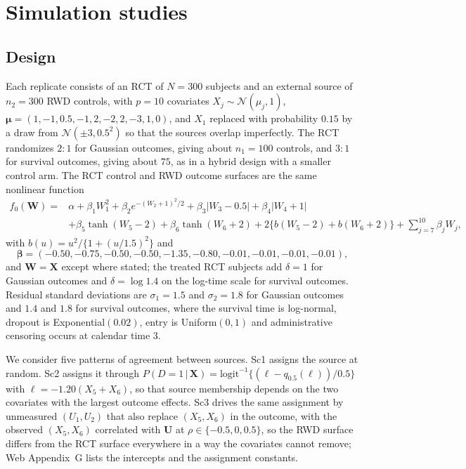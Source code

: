 \documentclass[11pt]{article}
\newcommand{\Normal}{\mathcal{N}}
\newcommand{\logit}{\mathrm{logit}}
\newcommand{\given}{\,\vert\,}
\theoremstyle{definition}
\theoremstyle{plain}
\begin{document}
\section{Simulation studies}
\label{sec:sim}

\subsection{Design}
\label{sec:sim_design}

Each replicate consists of an RCT of $N=300$ subjects and an external source of $n_2=300$ RWD controls, with $p=10$ covariates $X_j\sim\Normal(\mu_j,1)$, $\bm\mu=(1,-1,0.5,-1,2,-2,2,-3,1,0)$, and $X_1$ replaced with probability $0.15$ by a draw from $\Normal(\pm3,0.5^2)$ so that the sources overlap imperfectly. The RCT randomizes $2{:}1$ for Gaussian outcomes, giving about $n_1=100$ controls, and $3{:}1$ for survival outcomes, giving about $75$, as in a hybrid design with a smaller control arm. The RCT control and RWD outcome surfaces are the same nonlinear function
\begin{equation}
\begin{aligned}
f_0(\bm W)={}&\alpha+\beta_1W_1^2+\beta_2e^{-(W_2+1)^2/2}+\beta_3|W_3-0.5|+\beta_4|W_4+1|\\
&+\beta_5\tanh(W_5-2)+\beta_6\tanh(W_6+2)+2\{b(W_5-2)+b(W_6+2)\}+\textstyle\sum_{j=7}^{10}\beta_jW_j,
\end{aligned}
\label{eq:dgp}
\end{equation}
with $b(u)=u^2/\{1+(u/1.5)^2\}$ and
\[
\bm\beta=(-0.50,-0.75,-0.50,-0.50,-1.35,-0.80,-0.01,-0.01,-0.01,-0.01),
\]
and $\bm W=\bm X$ except where stated; the treated RCT subjects add $\delta=1$ for Gaussian outcomes and $\delta=\log1.4$ on the log-time scale for survival outcomes. Residual standard deviations are $\sigma_1=1.5$ and $\sigma_2=1.8$ for Gaussian outcomes and $1.4$ and $1.8$ for survival outcomes, where the survival time is log-normal, dropout is Exponential$(0.02)$, entry is Uniform$(0,1)$ and administrative censoring occurs at calendar time $3$.

We consider five patterns of agreement between sources. Sc1 assigns the source at random. Sc2 assigns it through $P(D=1\given\bm X)=\logit^{-1}\{(\ell-q_{0.5}(\ell))/0.5\}$ with $\ell=-1.20(X_5+X_6)$, so that source membership depends on the two covariates with the largest outcome effects. Sc3 drives the same assignment by unmeasured $(U_1,U_2)$ that also replace $(X_5,X_6)$ in the outcome, with the observed $(X_5,X_6)$ correlated with $\bm U$ at $\rho\in\{-0.5,0,0.5\}$, so the RWD surface differs from the RCT surface everywhere in a way the covariates cannot remove; Web Appendix~G lists the intercepts and the assignment constants.
\end{document}
